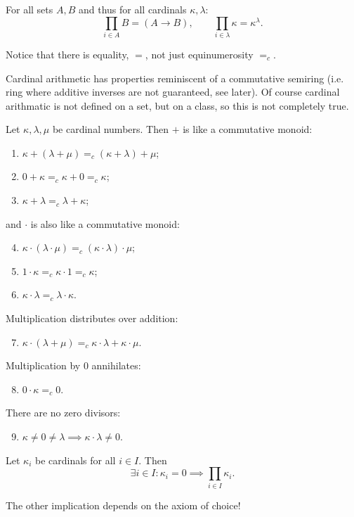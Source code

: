 \begin{lemma}
For all sets $A,B$ and thus for all cardinals $\kappa,\lambda$:
\[ \prod_{i\in A}B = (A\to B), \qquad \prod_{i\in\lambda}\kappa = \kappa^\lambda. \]
\end{lemma}
Notice that there is equality, $=$, not just equinumerosity $=_c$.

Cardinal arithmetic has properties reminiscent of a commutative semiring (i.e. ring where additive inverses are not guaranteed, see later). Of course cardinal arithmatic is not defined on a set, but on a class, so this is not completely true.
\begin{lemma} \label{lemma:cardinalArithmetic}
Let $\kappa,\lambda, \mu$ be cardinal numbers. Then $+$ is like a commutative monoid:
\begin{enumerate}
\item $\kappa + (\lambda+\mu) =_c (\kappa+\lambda)+\mu$;
\item $0+\kappa =_c \kappa+0 =_c \kappa$;
\item $\kappa+\lambda =_c \lambda+\kappa$;
\end{enumerate}
and $\cdot$ is also like a commutative monoid:
\begin{enumerate}
\setcounter{enumi}{3}
\item $\kappa \cdot (\lambda\cdot\mu) =_c (\kappa\cdot\lambda)\cdot\mu$;
\item $1\cdot\kappa =_c \kappa\cdot 1 =_c \kappa$;
\item $\kappa\cdot\lambda =_c \lambda\cdot\kappa$.
\end{enumerate}
Multiplication distributes over addition:
\begin{enumerate}
\setcounter{enumi}{6}
\item $\kappa\cdot(\lambda +\mu) =_c \kappa\cdot \lambda+\kappa\cdot\mu$.
\end{enumerate}
Multiplication by $0$ annihilates:
\begin{enumerate}
\setcounter{enumi}{7}
\item $0\cdot \kappa =_c 0$.
\end{enumerate}
There are no zero divisors:
\begin{enumerate}
\setcounter{enumi}{8}
\item $\kappa\neq 0 \neq \lambda \implies \kappa\cdot\lambda \neq 0$.
\end{enumerate}
\end{lemma}
\begin{lemma}
Let $\kappa_i$ be cardinals for all $i\in I$. Then
\[ \exists i\in I: \kappa_i = 0 \implies \prod_{i\in I}\kappa_i. \]
\end{lemma}
The other implication depends on the axiom of choice!

